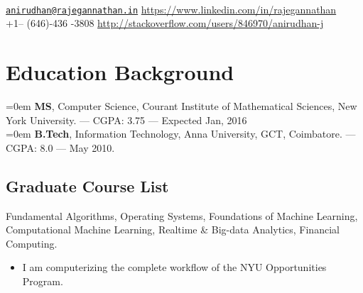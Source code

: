 \documentclass{resume}
\begin{document}
\\
{\href{mailto:anirudhan@rajegannathan.in}{\nolinkurl{anirudhan@rajegannathan.in}} \hfill \url{https://www.linkedin.com/in/rajegannathan}}\\
{+1-- (646)-436 -3808 \hfill \url{http://stackoverflow.com/users/846970/anirudhan-j}}

\section{Education Background}
\noindent \hangindent=0em  \textbf{MS}, Computer Science, Courant Institute of Mathematical Sciences, New York University. --- CGPA\@: 3.75 --- Expected Jan, 2016\\
\noindent \hangindent=0em  \textbf{B.Tech}, Information Technology, Anna University, GCT, Coimbatore. --- CGPA\@: 8.0 --- May 2010.

\subsection{Graduate Course List}
Fundamental Algorithms, Operating Systems, Foundations of Machine Learning, Computational Machine Learning, Realtime \& Big-data Analytics, Financial Computing.

\begin{itemize} \itemsep1pt \parskip0pt
  \item I am computerizing the complete workflow of the NYU Opportunities Program.
\end{itemize}
\end{document}

